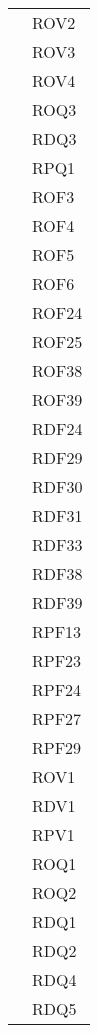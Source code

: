 \begin{longtable}{| p{5cm} | p{5cm} |}
				&	ROV2 \\
				&	ROV3 \\
				&	ROV4 \\
				&	ROQ3 \\
				&	RDQ3 \\
				&	RPQ1 \\
				 \hline
					
		\rowcolor{LightGray}
		\multirow[t]{23}{*}{\cellcolor{LightGray}}{Capitolato} 
				 & ROF3 \\
				\rowcolor{LightGray} &	ROF4 \\
				\rowcolor{LightGray} &	ROF5 \\
				\rowcolor{LightGray} &	ROF6 \\
				\rowcolor{LightGray} &	ROF24 \\
				\rowcolor{LightGray} &	ROF25 \\
				\rowcolor{LightGray} &	ROF38 \\
				\rowcolor{LightGray} &	ROF39 \\
				\rowcolor{LightGray} &	RDF24 \\
				\rowcolor{LightGray} &	RDF29 \\
				\rowcolor{LightGray} &	RDF30 \\
				\rowcolor{LightGray} &	RDF31 \\
				\rowcolor{LightGray} &	RDF33 \\
				\rowcolor{LightGray} &	RDF38 \\
				\rowcolor{LightGray} &	RDF39 \\
				\rowcolor{LightGray} &	RPF13 \\
				\rowcolor{LightGray} &	RPF23 \\
				\rowcolor{LightGray} &	RPF24 \\
				\rowcolor{LightGray} &	RPF27 \\
				\rowcolor{LightGray} &	RPF29 \\
				\rowcolor{LightGray} &	ROV1 \\
				\rowcolor{LightGray} &	RDV1 \\
				\rowcolor{LightGray} &	RPV1 \\
				\rowcolor{LightGray} &	ROQ1 \\
				\rowcolor{LightGray} &	ROQ2 \\
				\rowcolor{LightGray} &	RDQ1 \\
				\rowcolor{LightGray} &	RDQ2 \\
				\rowcolor{LightGray} &	RDQ4 \\
				\rowcolor{LightGray} &	RDQ5 \\

\end{longtable}
